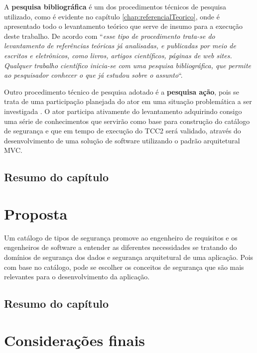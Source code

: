 A \textbf{pesquisa bibliográfica} é um dos procedimentos técnicos de pesquisa utilizado, como é evidente no capítulo \ref{chap:referencialTeorico}, onde é apresentado todo o levantamento teórico que serve de insumo para a execução deste trabalho. De acordo com \cite[p.35]{fonseca2002metodologia} “\textit{esse tipo de procedimento trata-se do levantamento de referências teóricas já analisadas, e publicadas por meio de escritos e eletrônicos, como livros, artigos científicos, páginas de web sites. Qualquer trabalho científico inicia-se com uma pesquisa bibliográfica, que permite ao pesquisador conhecer o que já estudou sobre o assunto}“.
 
Outro procedimento técnico de pesquisa adotado é a \textbf{pesquisa ação}, pois se trata de uma participação planejada do ator em uma situação problemática a ser investigada \cite{fonseca2002metodologia}. O ator participa ativamente do levantamento adquirindo consigo uma série de conhecimentos que servirão como base para construção do catálogo de segurança e que em tempo de execução do TCC2 será validado, através do desenvolvimento de uma solução de software utilizando o padrão arquitetural MVC. 


\section{Resumo do capítulo}

\chapter{Proposta}
\label{chap:proposta}


Um catálogo de tipos de segurança promove ao engenheiro de requisitos e os engenheiros de software a entender as diferentes necessidades se tratando do domínios de segurança dos dados e segurança arquitetural de uma aplicação. Pois com base no catálogo, pode se escolher os conceitos de segurança que são mais relevantes para o desenvolvimento da aplicação. 

\section{Resumo do capítulo}

\chapter{Considerações finais}